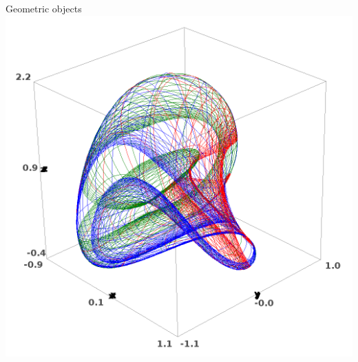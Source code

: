 \documentclass{beamer}
\newcommand{\fr}[1]{}
\newcommand{\en}[1]{#1}
\begin{document}
\begin{frame}{\fr{Objets géométriques}\en{Geometric objects}}
{    \includegraphics[height=.5\textheight]{Pictures/manifold.png}}
\end{frame}
\end{document}
